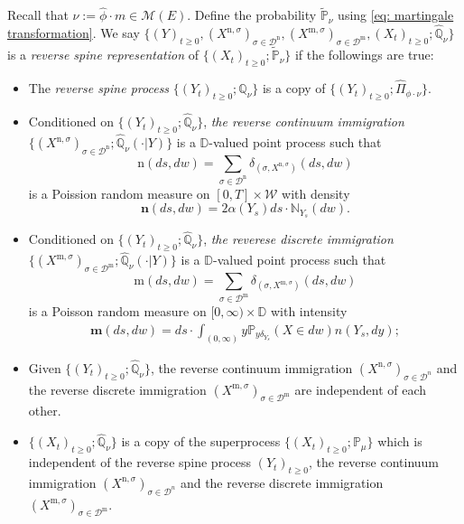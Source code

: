 \documentclass[12pt,a4paper]{amsart}
\theoremstyle{plain}
\theoremstyle{definition}
\numberwithin{equation}{section}
\begin{document}
    Recall that $\nu := \widehat \phi \cdot m \in \mathcal M(E)$. Define the probability $\widetilde {\mathbb P}_\nu$ using \eqref{eq: martingale transformation}.
    We say $\{(Y)_{t\geq 0}, (X^{\mathrm n, \sigma})_{\sigma\in \mathcal D^\mathrm n}, (X^{\mathrm m, \sigma})_{\sigma \in \mathcal D^\mathrm m}, (X_t)_{t\geq 0}; \hat {\mathbb Q}_{\nu}\}$ is a \emph{reverse spine representation} of $\{(X_t)_{t\geq 0}; \widetilde {\mathbb P}_\nu\}$ if the followings are true:
\begin{itemize}
\item
    The \emph{reverse spine process} $\{(Y_t)_{t\geq 0}; \widehat {\mathbb Q}_\nu\}$ is a copy of $\{(Y_t)_{t\geq 0}; \widehat \Pi_{\phi\cdot\nu}\}$.
\item
    Conditioned on $\{(Y_t)_{t\geq 0}; \widehat{\mathbb Q}_\nu\}$, \emph{the reverse continuum immigration} $\{ (X^{\mathrm n,\sigma})_{\sigma \in \mathcal D^\mathrm n}; \widehat{\mathbb Q}_\nu(\cdot |Y)\}$ is a $\mathbb D$-valued point process such that
\[
    \mathrm n(ds,dw)
    = \sum_{\sigma\in \mathcal D^{\mathrm n}} \delta_{(\sigma, X^{\mathrm n,\sigma})}(ds,dw)
\]
	is a Poission random measure on $[0,T]\times \mathcal W$ with density
\[
	\mathbf n(ds,dw)= 2\alpha(Y_s) ds \cdot \mathbb N_{Y_s}(dw).
\]
\item
    Conditioned on $\{(Y_t)_{t\geq 0}; \widehat{\mathbb Q}_\nu\}$, \emph{the reverese discrete immigration} $\{(X^{\mathrm m,\sigma})_{\sigma\in \mathcal D^{\mathrm m}}; \widehat{\mathbb Q}_\nu(\cdot |Y)\}$ is a $\mathbb D$-valued point process such that
\[
    \mathrm m(ds,dw)
    = \sum_{\sigma\in \mathcal D^{\mathrm m}} \delta_{(\sigma, X^{\mathrm m,\sigma})}(ds,dw)
\]
	is a Poisson random measure on $[0,\infty ) \times \mathbb D$ with intensity
\begin{align}\label{eq:meanMeasImmigr}
	\mathbf m(ds,dw)= ds \cdot \int_{(0,\infty)} y \mathbb P_{y\delta_{Y_s}}(X\in dw) n(Y_s,dy);
\end{align}
\item
	Given $\{(Y_t)_{t\geq 0}; \widehat{\mathbb Q}_\nu\}$, the reverse continuum immigration $(X^{\mathrm n,\sigma})_{\sigma \in \mathcal D^n}$ and the reverse discrete immigration $(X^{\mathrm m,\sigma})_{\sigma\in \mathcal D^{\mathrm m}}$ are independent of each other.
\item
	$\{(X_t)_{t\geq 0}; \widehat {\mathbb Q}_\nu\}$ is a copy of the superprocess $\{(X_t)_{t\geq 0}; \mathbb P_\mu\}$ which is independent of the reverse spine process $(Y_t)_{t\geq 0}$, the reverse continuum immigration $(X^{\mathrm n,\sigma})_{\sigma \in \mathcal D^n}$ and the reverse discrete immigration $(X^{\mathrm m,\sigma})_{\sigma\in \mathcal D^{\mathrm m}}$.
\end{itemize}
\end{document}
